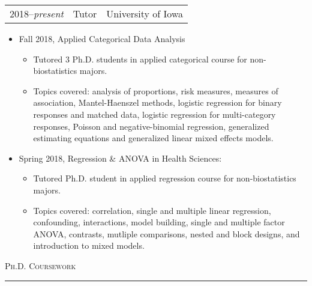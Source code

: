 \documentclass[a4paper]{article}
\begin{document}
\begin{tabular*}{0.95\textwidth}{@{\extracolsep{\fill}}ccc}
  2018--\textit{present} & Tutor & University of Iowa  \\
\end{tabular*}
\begin{itemize}[itemsep = 0.3ex, leftmargin = 1cm]
  \item Fall 2018, Applied Categorical Data Analysis
  \begin{itemize}[itemsep = 0.3ex]
    \item Tutored 3 Ph.D. students in applied categorical course for non-biostatistics majors.
    \item Topics covered: analysis of proportions, risk measures, measures of association,
      Mantel-Haenszel methods, logistic regression for binary responses and matched data,
      logistic regression for multi-category responses, Poisson and negative-binomial
      regression, generalized estimating equations and generalized linear mixed effects models.
  \end{itemize}
  \item Spring 2018, Regression \& ANOVA in Health Sciences:
  \begin{itemize}[itemsep = 0.3ex]
    \item Tutored Ph.D. student in applied regression course for non-biostatistics majors.
    \item Topics covered: correlation, single and multiple linear regression, confounding, interactions, model building,
      single and multiple factor ANOVA, contrasts, mutliple comparisons, nested and block designs, and introduction to
      mixed models.
  \end{itemize}
\end{itemize}
\vspace{0.25\baselineskip}

\begin{flushleft}
  \Large\textsc{Ph.D. Coursework}
  \textcolor{usafagrey}{\rule[0.5\baselineskip]{\textwidth}{0.75pt}}
\end{flushleft}
\vspace{-1.5\baselineskip}
\end{document}
